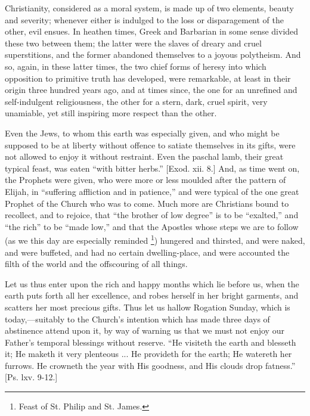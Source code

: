 Christianity, considered as a moral system, is made up of two
elements, beauty and severity; whenever either is indulged to the loss
or disparagement of the other, evil ensues. In heathen times, Greek
and Barbarian in some sense divided these two between them; the latter
were the slaves of dreary and cruel superstitions, and the former
abandoned themselves to a joyous polytheism. And so, again, in these
latter times, the two chief forms of heresy into which opposition to
primitive truth has developed, were remarkable, at least in their
origin three hundred years ago, and at times since, the one for an
unrefined and self-indulgent religiousness, the other for a stern,
dark, cruel spirit, very unamiable, yet still inspiring more respect
than the other.

Even the Jews, to whom this earth was especially given, and who
might be supposed to be at liberty without offence to satiate
themselves in its gifts, were not allowed to enjoy it without
restraint. Even the paschal lamb, their great typical feast, was eaten
``with bitter herbs.'' [Exod. xii. 8.] And, as time went on,
the Prophets were given, who were more or less moulded after the
pattern of Elijah, in ``suffering affliction and in
patience,'' and were typical of the one great Prophet of the
Church who was to come. Much more are Christians bound to recollect,
and to rejoice, that ``the brother of low degree'' is to be
``exalted,'' and ``the rich'' to be ``made
low,'' and that the Apostles whose steps we are to follow (as we
this day are especially reminded \footnote{Feast of St. Philip and St. James.}) hungered and thirsted, and were naked, and were buffeted, and
had no certain dwelling-place, and were accounted the filth of the
world and the offscouring of all things.

Let us thus enter upon the rich and happy months which lie before
us, when the earth puts forth all her excellence, and robes herself in
her bright garments, and scatters her most precious gifts. Thus let us
hallow Rogation Sunday, which is today,—suitably to the Church's
intention which has made three days of abstinence attend upon it, by
way of warning us that we must not enjoy our Father's temporal
blessings without reserve. ``He visiteth the earth and blesseth
it; He maketh it very plenteous ... He provideth for the earth; He
watereth her furrows. He crowneth the year with His goodness, and His
clouds drop fatness.'' [Ps. lxv. 9-12.]

